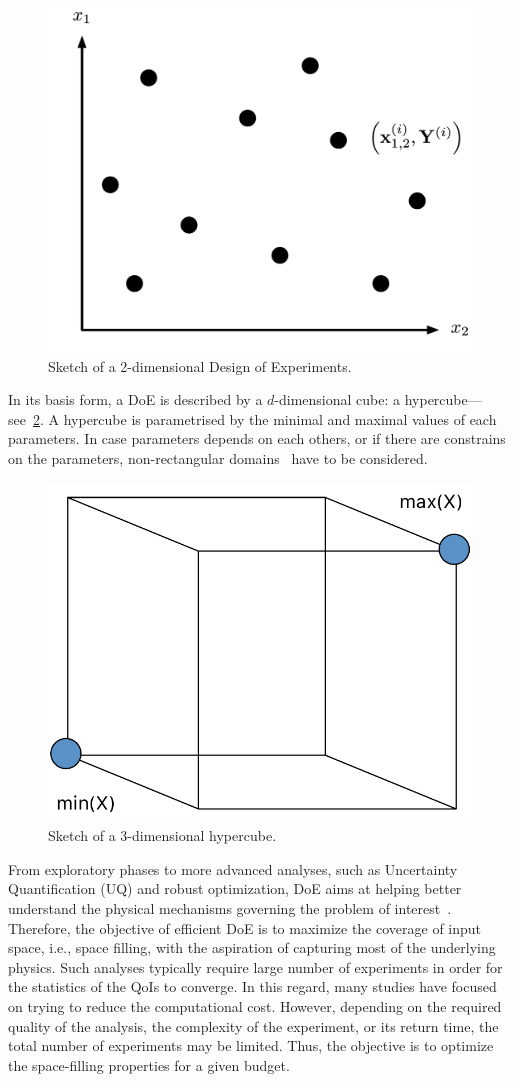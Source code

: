 \begin{figure}[H]
\centering
\includegraphics[width=0.5\linewidth,keepaspectratio]{fig/literature/doe.pdf}
\caption{Sketch of a 2-dimensional Design of Experiments.}
\label{fig:doe}
\end{figure}

In its basis form, a DoE is described by a $d$-dimensional cube: a hypercube---see~\cref{fig:hypercube}. A hypercube is parametrised by the minimal and maximal values of each parameters. In case parameters depends on each others, or if there are constrains on the parameters, non-rectangular domains~\citep{Lekivetz2015} have to be considered.

\begin{figure}[H]
\centering
\includegraphics[width=0.5\linewidth,keepaspectratio]{fig/literature/hypercube.pdf}
\caption{Sketch of a 3-dimensional hypercube.}
\label{fig:hypercube}
\end{figure}

From exploratory phases to more advanced analyses, such as Uncertainty Quantification (UQ) and robust optimization, DoE aims at helping better understand the physical mechanisms governing the problem of interest~\citep{Saltelli2007}. Therefore, the objective of efficient DoE is to maximize the coverage of input space, i.e., space filling, with the aspiration of capturing most of the underlying physics. Such analyses typically require large number of experiments in order for the statistics of the QoIs to converge. In this regard, many studies have focused on trying to reduce the computational cost. However, depending on the required quality of the analysis, the complexity of the experiment, or its return time, the total number of experiments may be limited. Thus, the objective is to optimize the space-filling properties for a given budget.

